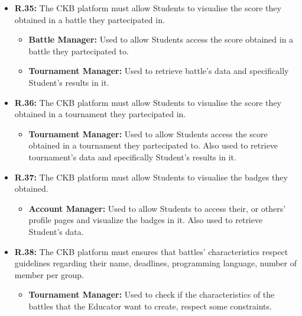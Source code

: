 \documentclass{article}
\begin{document}
{\begin{itemize}
\begin{itemize}
          \end{itemize}
    \item \textbf{R.35:} The CKB platform must allow Students to visualise the score they obtained in a battle they partecipated in.
          \begin{itemize}
              \item \textbf{Battle Manager:} Used to allow Students access the score obtained
              in a battle they partecipated to.
              \item \textbf{Tournament Manager:} Used to retrieve battle's data and specifically
              Student's results in it.
          \end{itemize}
    \item \textbf{R.36:} The CKB platform must allow Students to visualise the score they obtained in a tournament they partecipated in.
          \begin{itemize}
            \item \textbf{Tournament Manager:} Used to allow Students access the score obtained
            in a tournament they partecipated to. Also used to retrieve tournament's data and 
            specifically Student's results in it.
          \end{itemize}
    \item \textbf{R.37:} The CKB platform must allow Students to visualise the badges they obtained.
          \begin{itemize}
              \item \textbf{Account Manager:} Used to allow Students to access their, or others'
              profile pages and visualize the badges in it. Also used to retrieve Student's data.
          \end{itemize}
    \item \textbf{R.38:} The CKB platform must ensures that battles' characteristics respect guidelines
          regarding their name, deadlines, programming language, number of member per group.
          \begin{itemize}
            \item \textbf{Tournament Manager:} Used to check if the characteristics of the battles
              that the Educator want to create, respect some constraints.
          \end{itemize}
\end{itemize}

\newpage
\pagestyle{ImplementationIntegrationTestStyle}
}
\end{document}
